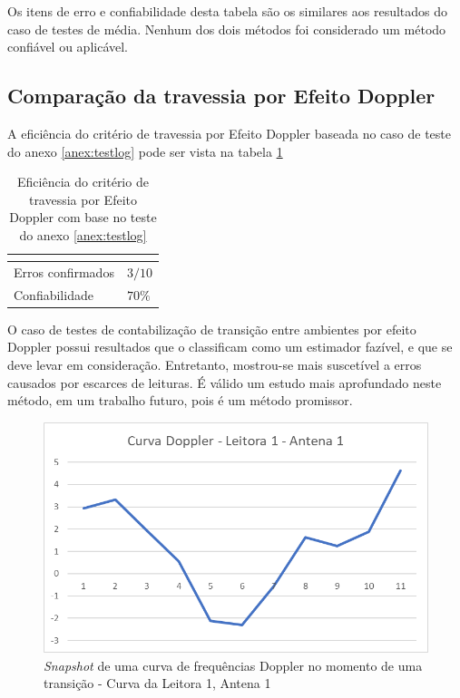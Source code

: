 Os itens de erro e confiabilidade desta tabela são os similares aos resultados do caso de testes de média. Nenhum dos dois métodos foi considerado um método confiável ou aplicável.

\subsection{Comparação da travessia por Efeito Doppler}


A eficiência do critério de travessia por Efeito Doppler baseada no caso de teste do anexo \ref{anex:testlog} pode ser vista na tabela \ref{tab:resultados5}

\begin{table}[H]
\centering
\caption{Eficiência do critério de travessia por Efeito Doppler com base no teste do anexo \ref{anex:testlog} }
\label{tab:resultados5}
\begin{tabular}{p{5cm} p{5cm}}
\hline
\multicolumn{2}{c}{\cellcolor{lightgray}{Eficiência do critério: Travessia por efeito Doppler}} \\ \hline
Erros confirmados          &  $3 / 10$        \\
Confiabilidade & $70\%$ \\ \hline
\end{tabular}
\end{table}

O caso de testes de contabilização de transição entre ambientes por efeito Doppler possui resultados que o classificam como um estimador fazível, e que se deve levar em consideração. Entretanto, mostrou-se mais suscetível a erros causados por escarces de leituras. É válido um estudo mais aprofundado neste método, em um trabalho futuro, pois é um método promissor.

\begin{figure}[H]
    \centering
    \includegraphics[width=0.8\linewidth]{figs/Resultados/image003.png}
    \caption{\textit{Snapshot} de uma curva de frequências Doppler no momento de uma transição - Curva da Leitora 1, Antena 1}
    \label{fig:tranDoppler11}
\end{figure}

